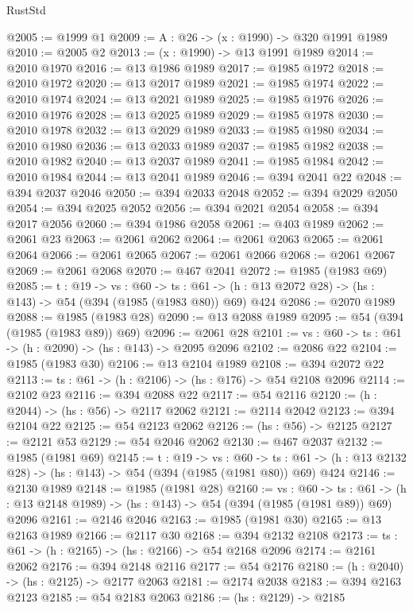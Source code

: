 \begin{lexlean}{RustStd}
\begin{coremodule}
@2005 := @1999 @1
@2009 := {A : @26} -> (x : @1990) -> @320 @1991 @1989
@2010 := @2005 @2
@2013 := (x : @1990) -> @13 @1991 @1989
@2014 := @2010 @1970
@2016 := @13 @1986 @1989
@2017 := @1985 @1972
@2018 := @2010 @1972
@2020 := @13 @2017 @1989
@2021 := @1985 @1974
@2022 := @2010 @1974
@2024 := @13 @2021 @1989
@2025 := @1985 @1976
@2026 := @2010 @1976
@2028 := @13 @2025 @1989
@2029 := @1985 @1978
@2030 := @2010 @1978
@2032 := @13 @2029 @1989
@2033 := @1985 @1980
@2034 := @2010 @1980
@2036 := @13 @2033 @1989
@2037 := @1985 @1982
@2038 := @2010 @1982
@2040 := @13 @2037 @1989
@2041 := @1985 @1984
@2042 := @2010 @1984
@2044 := @13 @2041 @1989
@2046 := @394 @2041 @22
@2048 := @394 @2037 @2046
@2050 := @394 @2033 @2048
@2052 := @394 @2029 @2050
@2054 := @394 @2025 @2052
@2056 := @394 @2021 @2054
@2058 := @394 @2017 @2056
@2060 := @394 @1986 @2058
@2061 := @403 @1989
@2062 := @2061 @23
@2063 := @2061 @2062
@2064 := @2061 @2063
@2065 := @2061 @2064
@2066 := @2061 @2065
@2067 := @2061 @2066
@2068 := @2061 @2067
@2069 := @2061 @2068
@2070 := @467 @2041
@2072 := @1985 (@1983 @69)
@2085 := {t : @19} ->
  {vs : @60} ->
  {ts : @61} -> (h : @13 @2072 @28) -> (hs : @143) -> @54 (@394 (@1985 (@1983 @80)) @69) @424
@2086 := @2070 @1989
@2088 := @1985 (@1983 @28)
@2090 := @13 @2088 @1989
@2095 := @54 (@394 (@1985 (@1983 @89)) @69)
@2096 := @2061 @28
@2101 := {vs : @60} -> {ts : @61} -> (h : @2090) -> (hs : @143) -> @2095 @2096
@2102 := @2086 @22
@2104 := @1985 (@1983 @30)
@2106 := @13 @2104 @1989
@2108 := @394 @2072 @22
@2113 := {ts : @61} -> (h : @2106) -> (hs : @176) -> @54 @2108 @2096
@2114 := @2102 @23
@2116 := @394 @2088 @22
@2117 := @54 @2116
@2120 := (h : @2044) -> (hs : @56) -> @2117 @2062
@2121 := @2114 @2042
@2123 := @394 @2104 @22
@2125 := @54 @2123 @2062
@2126 := (hs : @56) -> @2125
@2127 := @2121 @53
@2129 := @54 @2046 @2062
@2130 := @467 @2037
@2132 := @1985 (@1981 @69)
@2145 := {t : @19} ->
  {vs : @60} ->
  {ts : @61} -> (h : @13 @2132 @28) -> (hs : @143) -> @54 (@394 (@1985 (@1981 @80)) @69) @424
@2146 := @2130 @1989
@2148 := @1985 (@1981 @28)
@2160 := {vs : @60} ->
  {ts : @61} -> (h : @13 @2148 @1989) -> (hs : @143) -> @54 (@394 (@1985 (@1981 @89)) @69) @2096
@2161 := @2146 @2046
@2163 := @1985 (@1981 @30)
@2165 := @13 @2163 @1989
@2166 := @2117 @30
@2168 := @394 @2132 @2108
@2173 := {ts : @61} -> (h : @2165) -> (hs : @2166) -> @54 @2168 @2096
@2174 := @2161 @2062
@2176 := @394 @2148 @2116
@2177 := @54 @2176
@2180 := (h : @2040) -> (hs : @2125) -> @2177 @2063
@2181 := @2174 @2038
@2183 := @394 @2163 @2123
@2185 := @54 @2183 @2063
@2186 := (hs : @2129) -> @2185

\end{coremodule}
\end{lexlean}
